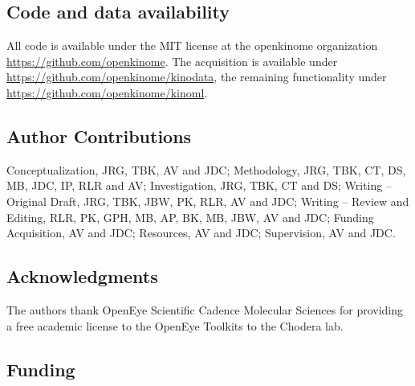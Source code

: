 \documentclass[9pt,lessons]{livecoms}
\begin{document}


\subsection{Code and data availability}
All code is available under the MIT license at the openkinome organization \url{https://github.com/openkinome}. The acquisition is available under \url{https://github.com/openkinome/kinodata}, the remaining functionality under \url{https://github.com/openkinome/kinoml}.

\subsection{Author Contributions}
Conceptualization, JRG, TBK, AV and JDC; 
Methodology, JRG, TBK, CT, DS, MB, JDC, IP, RLR and AV; 
Investigation, JRG, TBK, CT and DS; 
Writing – Original Draft, JRG, TBK, JBW, PK, RLR, AV and JDC; 
Writing – Review and Editing, RLR, PK, GPH, MB, AP, BK, MB, JBW, AV and JDC; 
Funding Acquisition, AV and JDC; 
Resources, AV and JDC;
Supervision, AV and JDC.

\subsection{Acknowledgments}

The authors thank OpenEye Scientific Cadence Molecular Sciences for providing a free academic license to the OpenEye Toolkits to the Chodera lab.


\subsection{Funding}
\end{document}
